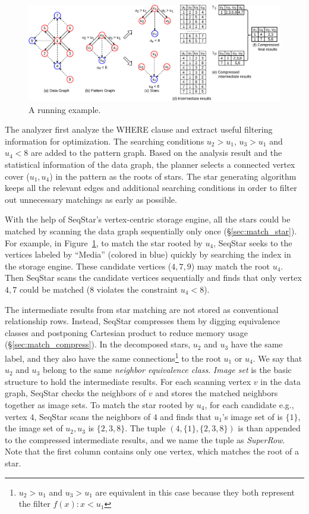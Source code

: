 \begin{figure}[ht]
  \centering
  \includegraphics[width=\textwidth]{img/running_example.pdf}
  \caption{A running example.}\label{img:running_example}
\end{figure}

The analyzer first analyze the WHERE clause and extract useful filtering information for optimization.
The searching conditions $u_2> u_1$, $u_3 > u_1$ and $u_4 < 8$ are added to the pattern graph.
Based on the analysis result and the statistical information of the data graph,
the planner selects a connected vertex cover ($u_1, u_4$) in the pattern as the roots of stars.
The star generating algorithm keeps all the relevant edges and additional searching conditions in order to filter out unnecessary matchings as early as possible.

With the help of SeqStar's vertex-centric storage engine,
all the stars could be matched by scanning the data graph sequentially only once (\S\ref{sec:match_star}).
For example, in Figure~\ref{img:running_example}, to match the star rooted by $u_4$,
SeqStar seeks to the vertices labeled by ``Media'' (colored in blue) quickly by searching the index in the storage engine.
These candidate vertices ($4, 7, 9$) may match the root $u_4$.
Then SeqStar scans the candidate vertices sequentially and finds that only vertex $4, 7$ could be matched ($8$ violates the constraint $u_4 < 8$).

The intermediate results from star matching are not stored as conventional relationship rows.
Instead, SeqStar compresses them by digging equivalence classes and postponing Cartesian product to reduce memory usage (\S\ref{sec:match_compress}).
In the decomposed stars, $u_2$ and $u_3$ have the same label, and they also have the same connections\footnote{$u_2 > u_1$ and $u_3 > u_1$ are equivalent in this case because they both represent the filter $f(x): x < u_1$} to the root $u_1$ or $u_4$.
We say that $u_2$ and $u_3$ belong to the same \emph{neighbor equivalence class}.
\emph{Image set} is the basic structure to hold the intermediate results.
For each scanning vertex $v$ in the data graph,
SeqStar checks the neighbors of $v$ and stores the matched neighbors together as image sets.
To match the star rooted by $u_4$,
for each candidate e.g., vertex $4$, SeqStar scans the neighbors of $4$ and finds that $u_1$'s image set of is $\{1\}$,
the image set of $u_2, u_3$ is $\{2, 3, 8\}$.
The tuple $(4, \{1\}, \{2, 3, 8\})$ is than appended to the compressed intermediate results,
and we name the tuple as \emph{SuperRow}.
Note that the first column contains only one vertex, which matches the root of a star.

